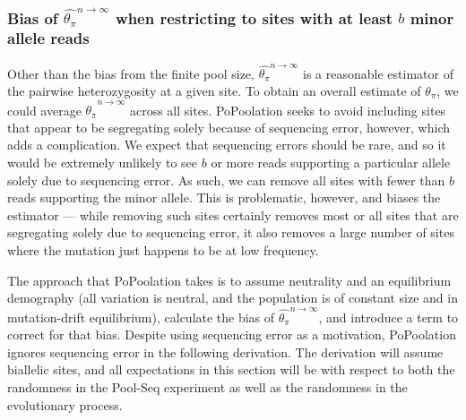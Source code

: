\documentclass[letterpaper,fontsize=9pt,DIV=12]{scrartcl}
\newcounter{todo}
\newcounter{popoolissue}
\newcommand\todo[1]{}
\newcommand\popoolissue[1]{}
\newcommand{\samplesize}{n}
\newcommand{\thetapi}{\widehat{\theta_\pi}}
\begin{document}
\popoolissue{We think that it is makes sense to compute only on biallelic SNPs, as this is a theoretical derivation of $4N_e\mu$, which assumes the infinitesimal model (which does not allow for multi-allelic loci). Still, we briefly wanted to check in with you here. Our guess is that the computation in code is just done for all four nucleotides to keep the code simple -- but the function only gets called for biallelic sites, so it behaves as if it was only computed for biallelic SNPs. Is that right?}



\subsubsection*{Bias of $\thetapi^{\samplesize\to\infty}$ when restricting to sites with at least $b$ minor allele reads}
\label{supp:sec:ThetaPi:sub:PoolSequencing:sub:ExpectedValue}

Other than the bias from the finite pool size, $\thetapi^{\samplesize\to\infty}$ is a reasonable estimator of the pairwise heterozygosity at a given site.  To obtain an overall estimate of $\theta_\pi$, we could average $\thetapi^{\samplesize\to\infty}$ across all sites.  PoPoolation seeks to avoid including sites that appear to be segregating solely because of sequencing error, however, which adds a complication.  We expect that sequencing errors should be rare, and so it would be extremely unlikely to see $b$ or more reads supporting a particular allele solely due to sequencing error.  As such, we can remove all sites with fewer than $b$ reads supporting the minor allele.  This is problematic, however, and biases the estimator --- while removing such sites certainly removes most or all sites that are segregating solely due to sequencing error, it also removes a large number of sites where the mutation just happens to be at low frequency.

The approach that PoPoolation takes is to assume neutrality and an equilibrium demography (all variation is neutral, and the population is of constant size and in mutation-drift equilibrium), calculate the bias of $\thetapi^{\samplesize\to\infty}$, and introduce a term to correct for that bias.  Despite using sequencing error as a motivation, PoPoolation ignores sequencing error in the following derivation.  The derivation will assume biallelic sites, and all expectations in this section will be with respect to both the randomness in the Pool-Seq experiment as well as the randomness in the evolutionary process.  
\end{document}

